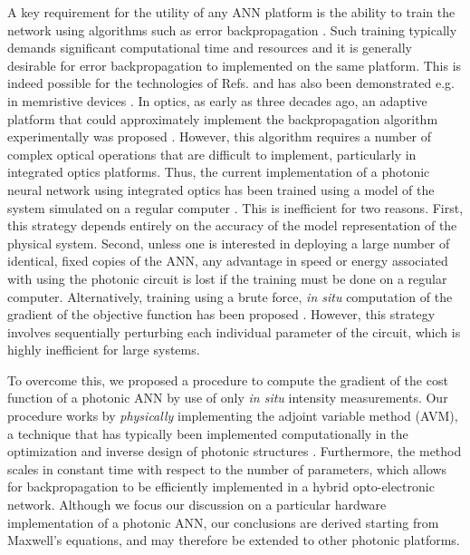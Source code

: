 A key requirement for the utility of any ANN platform is the ability to train the network using algorithms such as error backpropagation \cite{Rumelhart1986}. Such training typically demands significant computational time and resources and it is generally desirable for error backpropagation to implemented on the same platform. This is indeed possible for the technologies of Refs. \cite{Merolla2014, Graves2016, hermans2015trainable} and has also been demonstrated e.g. in memristive devices \cite{alibart2013pattern, Prezioso2015}. In optics, as early as three decades ago, an adaptive platform that could approximately implement the backpropagation algorithm experimentally was proposed \cite{wagner1987multilayer,psaltis1988adaptive}. However, this algorithm requires a number of complex optical operations that are difficult to implement, particularly in integrated optics platforms. Thus, the current implementation of a photonic neural network using integrated optics has been trained using a model of the system simulated on a regular computer \cite{Shen2017}. This is inefficient for two reasons. First, this strategy depends entirely on the accuracy of the model representation of the physical system. Second, unless one is interested in deploying a large number of identical, fixed copies of the ANN, any advantage in speed or energy associated with using the photonic circuit is lost if the training must be done on a regular computer.  Alternatively, training using a brute force, \textit{in situ} computation of the gradient of the objective function has been proposed \cite{Shen2017}. However, this strategy involves sequentially perturbing each individual parameter of the circuit, which is highly inefficient for large systems.

To overcome this, we proposed \cite{hughes2018training} a procedure to compute the gradient of the cost function of a photonic ANN by use of only \textit{in situ} intensity measurements.    Our procedure works by \textit{physically} implementing the adjoint variable method (AVM), a technique that has typically been implemented computationally in the optimization and inverse design of photonic structures \cite{Georgieva2002, Veronis2004, hughes2017method}.  Furthermore, the method scales in constant time with respect to the number of parameters, which allows for backpropagation to be efficiently implemented in a hybrid opto-electronic network.  Although we focus our discussion on a particular hardware implementation of a photonic ANN, our conclusions are derived starting from Maxwell’s equations, and may therefore be extended to other photonic platforms.


